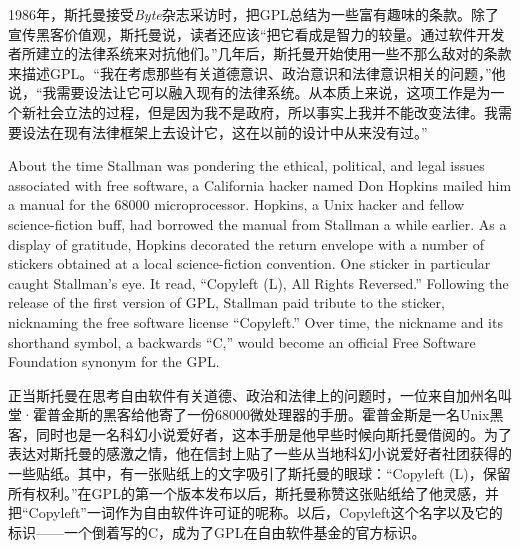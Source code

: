 \ifdefined\chs
1986年，斯托曼接受\textit{Byte}杂志采访时，把GPL总结为一些富有趣味的条款。除了宣传黑客价值观，斯托曼说，读者还应该``把它看成是智力的较量。通过软件开发者所建立的法律系统来对抗他们。''几年后，斯托曼开始使用一些不那么敌对的条款来描述GPL。``我在考虑那些有关道德意识、政治意识和法律意识相关的问题，''他说，``我需要设法让它可以融入现有的法律系统。从本质上来说，这项工作是为一个新社会立法的过程，但是因为我不是政府，所以事实上我并不能改变法律。我需要设法在现有法律框架上去设计它，这在以前的设计中从来没有过。''
\fi

\ifdefined\eng
About the time Stallman was pondering the ethical, political, and legal issues associated with free software, a California hacker named Don Hopkins mailed him a manual for the 68000 microprocessor. Hopkins, a Unix hacker and fellow science-fiction buff, had borrowed the manual from Stallman a while earlier. As a display of gratitude, Hopkins decorated the return envelope with a number of stickers obtained at a local science-fiction convention. One sticker in particular caught Stallman's eye. It read, ``Copyleft (L), All Rights Reversed.'' Following the release of the first version of GPL, Stallman paid tribute to the sticker, nicknaming the free software license ``Copyleft.'' Over time, the nickname and its shorthand symbol, a backwards ``C,'' would become an official Free Software Foundation synonym for the GPL.
\fi

\ifdefined\chs
正当斯托曼在思考自由软件有关道德、政治和法律上的问题时，一位来自加州名叫堂·霍普金斯的黑客给他寄了一份68000微处理器的手册。霍普金斯是一名Unix黑客，同时也是一名科幻小说爱好者，这本手册是他早些时候向斯托曼借阅的。为了表达对斯托曼的感激之情，他在信封上贴了一些从当地科幻小说爱好者社团获得的一些贴纸。其中，有一张贴纸上的文字吸引了斯托曼的眼球：``Copyleft (L)，保留所有权利。''在GPL的第一个版本发布以后，斯托曼称赞这张贴纸给了他灵感，并把``Copyleft''一词作为自由软件许可证的呢称。以后，Copyleft这个名字以及它的标识——一个倒着写的C，成为了GPL在自由软件基金的官方标识。
\fi

